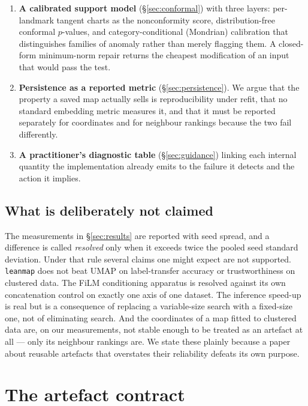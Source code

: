 \documentclass[12pt]{iopart}
\theoremstyle{definition}
\theoremstyle{plain}
\theoremstyle{remark}
\newcommand{\code}[1]{\texttt{#1}}
\begin{document}
\begin{enumerate}[leftmargin=*]
  constrains the \emph{ordering} of neighbourhood radii but deliberately not
  their magnitude.
\item \textbf{A calibrated support model} (\S\ref{sec:conformal}) with three
  layers: per-landmark tangent charts as the nonconformity score,
  distribution-free conformal $p$-values, and category-conditional (Mondrian)
  calibration that distinguishes families of anomaly rather than merely
  flagging them. A closed-form minimum-norm repair returns the cheapest
  modification of an input that would pass the test.
\item \textbf{Persistence as a reported metric} (\S\ref{sec:persistence}). We
  argue that the property a saved map actually sells is reproducibility under
  refit, that no standard embedding metric measures it, and that it must be
  reported separately for coordinates and for neighbour rankings because the
  two fail differently.
\item \textbf{A practitioner's diagnostic table} (\S\ref{sec:guidance}) linking
  each internal quantity the implementation already emits to the failure it
  detects and the action it implies.
\end{enumerate}

\subsection{What is deliberately not claimed}

The measurements in \S\ref{sec:results} are reported with seed spread, and a
difference is called \emph{resolved} only when it exceeds twice the pooled
seed standard deviation. Under that rule several claims one might expect are
not supported. \code{leanmap} does not beat UMAP on label-transfer accuracy or
trustworthiness on clustered data. The FiLM conditioning apparatus is resolved
against its own concatenation control on exactly one axis of one dataset. The
inference speed-up is real but is a consequence of replacing a variable-size
search with a fixed-size one, not of eliminating search. And the coordinates of
a map fitted to clustered data are, on our measurements, not stable enough to
be treated as an artefact at all --- only its neighbour rankings are. We state
these plainly because a paper about reusable artefacts that overstates their
reliability defeats its own purpose.

\section{The artefact contract}
\label{sec:contract}
\end{document}
